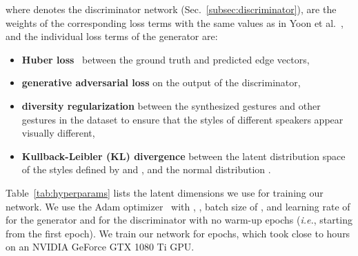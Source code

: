 \documentclass[conference,compsoc]{IEEEtran}
\theoremstyle{definition}
\begin{document}
where  denotes the discriminator network (Sec.~\ref{subsec:discriminator}),  are the weights of the corresponding loss terms with the same values as in Yoon et al.~\cite{trimodal}, and the individual loss terms of the generator are:
\begin{itemize}
    \item \textbf{Huber loss}~\cite{huber_loss} between the ground truth and predicted edge vectors,
    \item \textbf{generative adversarial loss} on the output of the discriminator,
    
    \item \textbf{diversity regularization} between the synthesized gestures and other gestures in the dataset to ensure that the styles of different speakers appear visually different,
    \item \textbf{Kullback-Leibler (KL) divergence} between the latent distribution space of the styles defined by  and , and the normal distribution .
\end{itemize}
Table~\ref{tab:hyperparams} lists the latent dimensions we use for training our network. We use the Adam optimizer~\cite{adam} with , , batch size of , and learning rate of  for the generator and  for the discriminator with no warm-up epochs (\textit{i.e.},  starting from the first epoch). We train our network for  epochs, which took close to  hours on an NVIDIA GeForce GTX 1080 Ti GPU.
\end{document}
